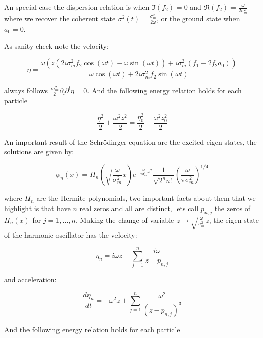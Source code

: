 \documentclass[a4paper,12pt]{article}
\begin{document}
An special case the dispersion relation is when $\Im(f_2)=0$ and $\Re(f_2) = \frac{\omega}{2\sigma_m^2}$ where we recover the coherent state $\sigma^2(t) = \frac{\sigma_m^2}{2\omega}$, or the ground state when $a_0=0$.

As sanity check note the velocity:

\begin{equation}
\eta = \frac{\omega\left(  z (  2i\sigma_m^2f_2 \cos(\omega t) - \omega \sin(\omega t)) + i \sigma_m^2(f_1 - 2f_2 a_0)  \right)}{\omega \cos(\omega t) + 2i\sigma_m^2f_2 \sin(\omega t)} 
\end{equation}

always follows $\frac{i\sigma_m^2}{2 } \partial_l \partial^l \eta = 0$. And the following energy relation holds for each particle

\begin{equation}
\frac{\eta^2}{2} + \frac{\omega^2 z^2}{2} = \frac{\eta_0^2}{2} + \frac{\omega^2 z_0^2}{2}
\end{equation}


An important result of the Schr\"odinger equation are the excited eigen states, the solutions are given by:

\begin{equation}
\phi_n(x) = H_n\left( \sqrt{\frac{\omega}{\sigma_m^2}}x \right) e^{-\frac{\omega}{2\sigma_m^2}x^2}
\frac{1}{\sqrt{2^n n!}}\left(\frac{\omega}{\pi \sigma_m^2} \right)^{1/4}
\end{equation}

where $H_n$ are the Hermite polynomials, two important facts about them that we highlight is that have $n$ real zeros and all are distinct, lets call $p_{n,j}$ the zeros of $H_n(x)$ for $j=1,...,n$. Making the change of variable $z\rightarrow \sqrt{\frac{\omega}{\sigma_m^2}}z$, the eigen state of the harmonic oscillator has the velocity:

\begin{equation}
\eta_n = i\omega z - \sum_{j=1}^{n} \frac{i \omega}{z - p_{n,j}}
\end{equation}

and acceleration:

\begin{equation}
\frac{d\eta_n}{dt} = -\omega^2 z + \sum_{j=1}^{n} \frac{\omega^2}{ \left( z - p_{n,j} \right)^3}
\end{equation}

And the following energy relation holds for each particle
\end{document}

